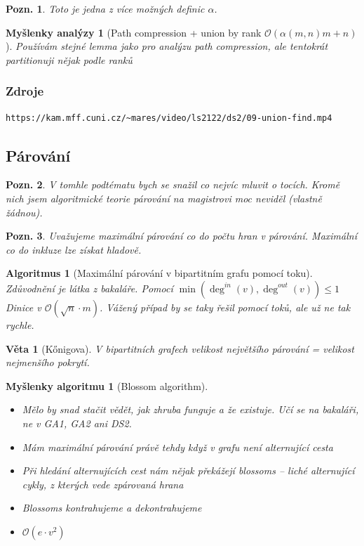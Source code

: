 \documentclass{article}
\theoremstyle{noparens}
\newtheorem*{thm}{Věta}
\newtheorem*{alg}{Algoritmus}
\theoremstyle{noparens-mys}
\newtheorem*{anal-mys}{Myšlenky analýzy}
\newtheorem*{alg-mys}{Myšlenky algoritmu}
\theoremstyle{noparens-note}
\newtheorem*{note}{Pozn.}
\newcommand{\OO}{\mathcal{O}}
\begin{document}
\begin{note}
    Toto je jedna z více možných definic $\alpha$.
\end{note}

\begin{anal-mys}[Path compression + union by rank $\OO(\alpha(m, n)m + n)$]
    Používám stejné lemma jako pro analýzu path compression, ale tentokrát
    partitionuji nějak podle ranků
\end{anal-mys}

\subsubsection*{Zdroje}

\begin{verbatim}
https://kam.mff.cuni.cz/~mares/video/ls2122/ds2/09-union-find.mp4
\end{verbatim}


\subsection{Párování}

\begin{note}
    V tomhle podtématu bych se snažil co nejvíc mluvit o tocích.  Kromě nich
    jsem algoritmické teorie párování na magistrovi moc neviděl (vlastně
    žádnou).
\end{note}

\begin{note}
    Uvažujeme maximální párování co do počtu hran v párování. Maximální co do
    inkluze lze získat hladově.
\end{note}

\begin{alg}[Maximální párování v bipartitním grafu pomocí toku]
    Zdůvodnění je látka z bakaláře.  Pomocí $\min(\deg^{in}(v), \deg^{out}(v))
    \le 1$ Dinice v $\OO(\sqrt{n} \cdot m)$.  Vážený případ by se taky řešil
    pomocí toků, ale už ne tak rychle.
\end{alg}

\begin{thm}[Kőnigova]
    V bipartitních grafech velikost největšího párování = velikost nejmenšího
    pokrytí.
\end{thm}

\begin{alg-mys}[Blossom algorithm]
    ~
    
    \begin{itemize}
        \item Mělo by snad stačit vědět, jak zhruba funguje a že existuje.  Učí
            se na bakaláři, ne v GA1, GA2 ani DS2.
        \item Mám maximální párování právě tehdy když v grafu není alternující
            cesta
        \item Při hledání alternujících cest nám nějak překážejí blossoms --
            liché alternující cykly, z kterých vede zpárovaná hrana
        \item Blossoms kontrahujeme a dekontrahujeme
        \item $\OO(e \cdot v^2)$
    \end{itemize}
\end{alg-mys}
\end{document}
